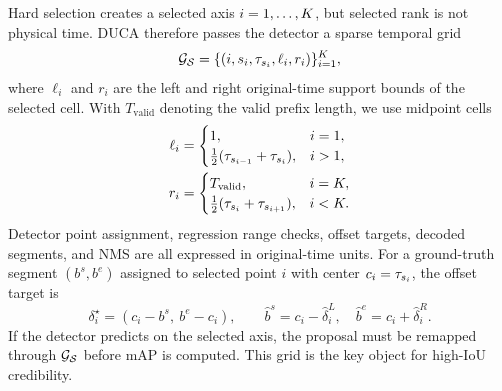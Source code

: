 Hard selection creates a selected axis $i=1,\ldots,K$, but selected rank is
not physical time. DUCA therefore passes the detector a sparse temporal grid
\begin{equation}
    \mathcal{G}_{\mathcal{S}}
    =
    \{(i, s_i, \tau_{s_i}, \ell_i, r_i)\}_{i=1}^{K},
    \label{eq:sparse_grid}
\end{equation}
where $\ell_i$ and $r_i$ are the left and right original-time support bounds of
the selected cell. With $T_{\mathrm{valid}}$ denoting the valid prefix length,
we use midpoint cells
\begin{align}
    \ell_i &=
    \begin{cases}
    1, & i=1,\\
    \frac{1}{2}(\tau_{s_{i-1}}+\tau_{s_i}), & i>1,
    \end{cases}
    \notag\\
    r_i &=
    \begin{cases}
    T_{\mathrm{valid}}, & i=K,\\
    \frac{1}{2}(\tau_{s_i}+\tau_{s_{i+1}}), & i<K.
    \end{cases}
    \label{eq:grid_cells}
\end{align}
Detector point assignment, regression range checks, offset targets, decoded
segments, and NMS are all expressed in original-time units. For a ground-truth
segment $(b^s,b^e)$ assigned to selected point $i$ with center
$c_i=\tau_{s_i}$, the offset target is
\begin{equation}
    \delta_i^\star=(c_i-b^s,\ b^e-c_i),
    \qquad
    \hat b^s=c_i-\hat\delta_i^L,\quad
    \hat b^e=c_i+\hat\delta_i^R .
    \label{eq:original_time_decode}
\end{equation}
If the detector predicts on the selected axis, the proposal must be remapped
through $\mathcal{G}_{\mathcal{S}}$ before mAP is computed. This grid is the key object for
high-IoU credibility.
